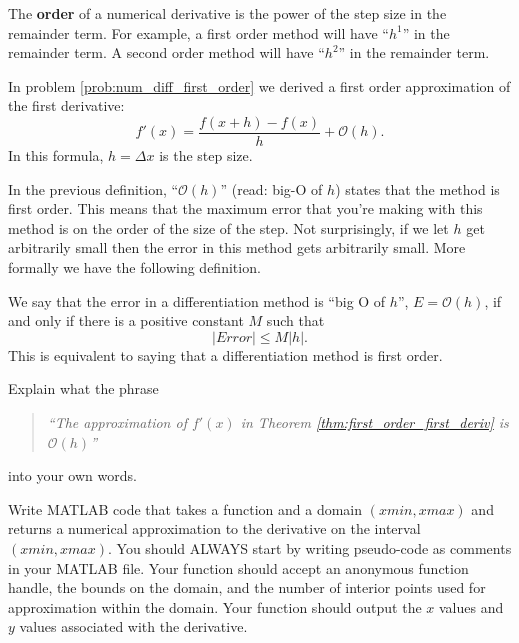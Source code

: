 \begin{definition}
    The {\bf order} of a numerical derivative is the power of the step size in the
    remainder term.  For example, a first order method will have ``$h^1$'' in the
    remainder term.  A second order method will have ``$h^2$'' in the remainder term.
\end{definition}

\begin{thm}\label{thm:first_order_first_deriv}
    In problem \ref{prob:num_diff_first_order} we derived a first order approximation of
    the first derivative:
    \[ f'(x) = \frac{f(x+h) - f(x)}{h} + \mathcal{O}(h). \]
    In this formula, $h = \Delta x$ is the step size.
\end{thm}
In the previous definition, ``$\mathcal{O}(h)$'' (read: big-O of $h$) states that the
method is first order.  This means that the maximum error that you're making with this
method is on the order of the size of the step.  Not surprisingly, if we let $h$ get
arbitrarily small then the error in this method gets arbitrarily small.  More formally we
have the following definition.

\begin{definition}
    We say that the error in a differentiation method is ``big O of $h$'', $E =
    \mathcal{O}(h)$, if and only if there is a positive constant $M$ such that 
    \[ |Error| \le M |h|. \]
    This is equivalent to saying that a differentiation method is first order.
\end{definition}

\begin{problem}
    Explain what the phrase
    \begin{quote}
        {\it ``The approximation of $f'(x)$ in Theorem \ref{thm:first_order_first_deriv} is $\mathcal{O}(h)$''}
    \end{quote}
    into your own words.  
\end{problem}

\begin{problem}
    Write MATLAB code that takes a function and a domain $(xmin,xmax)$ and
    returns a numerical approximation to the derivative on the interval
    $(xmin,xmax)$. You should ALWAYS start by writing pseudo-code as comments in your
    MATLAB file.   Your function should accept an anonymous function handle, the
    bounds on the domain, and the number of interior points used for approximation within
    the domain.  Your function should output the $x$ values and $y$ values associated with
    the derivative.\\
\end{problem}

